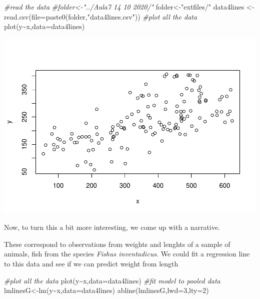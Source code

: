 \documentclass[
]{book}
\newenvironment{Shaded}{\begin{snugshade}}{\end{snugshade}}
\newcommand{\AttributeTok}[1]{\textcolor[rgb]{0.77,0.63,0.00}{#1}}
\newcommand{\CommentTok}[1]{\textcolor[rgb]{0.56,0.35,0.01}{\textit{#1}}}
\newcommand{\DecValTok}[1]{\textcolor[rgb]{0.00,0.00,0.81}{#1}}
\newcommand{\FunctionTok}[1]{\textcolor[rgb]{0.00,0.00,0.00}{#1}}
\newcommand{\NormalTok}[1]{#1}
\newcommand{\OtherTok}[1]{\textcolor[rgb]{0.56,0.35,0.01}{#1}}
\newcommand{\SpecialCharTok}[1]{\textcolor[rgb]{0.00,0.00,0.00}{#1}}
\newcommand{\StringTok}[1]{\textcolor[rgb]{0.31,0.60,0.02}{#1}}
\begin{document}
\begin{Shaded}
\begin{Highlighting}[]
\CommentTok{\#read the data}
\CommentTok{\#folder\textless{}{-}"../Aula7 14 10 2020/"}
\NormalTok{folder}\OtherTok{\textless{}{-}}\StringTok{"extfiles/"}
\NormalTok{data4lines }\OtherTok{\textless{}{-}} \FunctionTok{read.csv}\NormalTok{(}\AttributeTok{file=}\FunctionTok{paste0}\NormalTok{(folder,}\StringTok{"data4lines.csv"}\NormalTok{))}
\CommentTok{\#plot all the data}
\FunctionTok{plot}\NormalTok{(y}\SpecialCharTok{\textasciitilde{}}\NormalTok{x,}\AttributeTok{data=}\NormalTok{data4lines)}
\end{Highlighting}
\end{Shaded}

\includegraphics{ECOMODbook_files/figure-latex/a7.9-1.pdf}

Now, to turn this a bit more interesting, we come up with a narrative.

These correspond to observations from weights and lenghts of a sample of animals, fish from the species \emph{Fishus inventadicus}. We could fit a regression line to this data and see if we can predict weight from length

\begin{Shaded}
\begin{Highlighting}[]
\CommentTok{\#plot all the data}
\FunctionTok{plot}\NormalTok{(y}\SpecialCharTok{\textasciitilde{}}\NormalTok{x,}\AttributeTok{data=}\NormalTok{data4lines)}
\CommentTok{\#fit model to pooled data}
\NormalTok{lmlinesG}\OtherTok{\textless{}{-}}\FunctionTok{lm}\NormalTok{(y}\SpecialCharTok{\textasciitilde{}}\NormalTok{x,}\AttributeTok{data=}\NormalTok{data4lines)}
\FunctionTok{abline}\NormalTok{(lmlinesG,}\AttributeTok{lwd=}\DecValTok{3}\NormalTok{,}\AttributeTok{lty=}\DecValTok{2}\NormalTok{)}
\end{Highlighting}
\end{Shaded}
\end{document}
